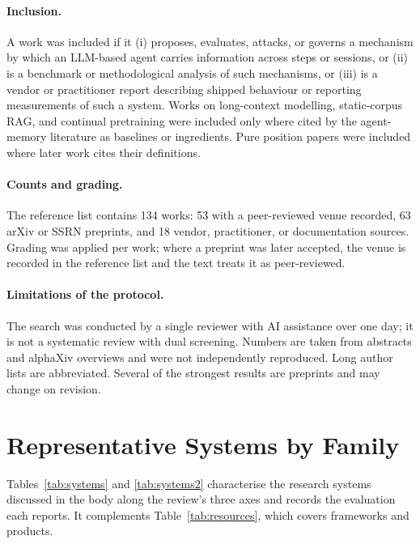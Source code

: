 \documentclass[11pt]{article}
\begin{document}
\paragraph{Inclusion.} A work was included if it (i) proposes, evaluates, attacks, or governs a mechanism by which an LLM-based agent carries information across steps or sessions, or (ii) is a benchmark or methodological analysis of such mechanisms, or (iii) is a vendor or practitioner report describing shipped behaviour or reporting measurements of such a system. Works on long-context modelling, static-corpus RAG, and continual pretraining were included only where cited by the agent-memory literature as baselines or ingredients. Pure position papers were included where later work cites their definitions.

\paragraph{Counts and grading.} The reference list contains 134 works: 53 with a peer-reviewed venue recorded, 63 arXiv or SSRN preprints, and 18 vendor, practitioner, or documentation sources. Grading was applied per work; where a preprint was later accepted, the venue is recorded in the reference list and the text treats it as peer-reviewed.

\paragraph{Limitations of the protocol.} The search was conducted by a single reviewer with AI assistance over one day; it is not a systematic review with dual screening. Numbers are taken from abstracts and alphaXiv overviews and were not independently reproduced. Long author lists are abbreviated. Several of the strongest results are preprints and may change on revision.

\section{Representative Systems by Family}
\label{app:systems}

Tables~\ref{tab:systems} and \ref{tab:systems2} characterise the research systems discussed in the body along the review's three axes and records the evaluation each reports. It complements Table~\ref{tab:resources}, which covers frameworks and products.
\end{document}
